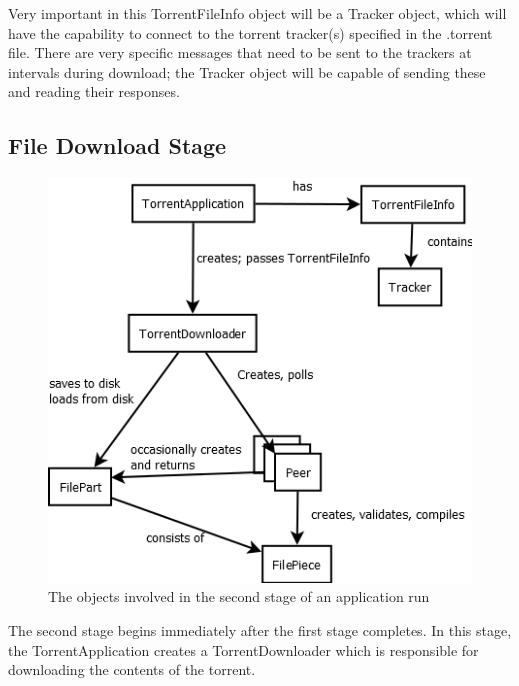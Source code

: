 \documentclass[letter]{scrartcl}
\begin{document}
Very important in this TorrentFileInfo object will be a Tracker object, which will have the capability to connect to the torrent tracker(s) specified in the .torrent file.  There are very specific messages that need to be sent to the trackers at intervals during download; the Tracker object will be capable of sending these and reading their responses.

\subsection{File Download Stage}

\begin{figure}[h]
\centering
\includegraphics[scale=.5]{stepTwo.png}
\caption{The objects involved in the second stage of an application run}
\end{figure}

The second stage begins immediately after the first stage completes.   In this stage, the TorrentApplication creates a TorrentDownloader which is responsible for downloading the contents of the torrent.
\end{document}
